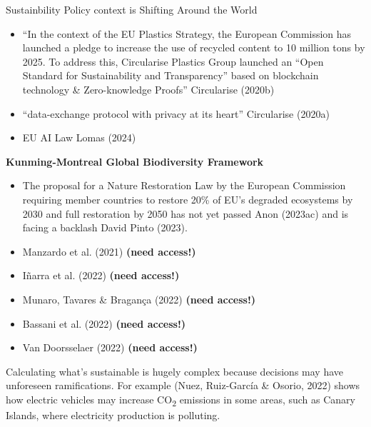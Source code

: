\documentclass[
  letterpaper,
  DIV=11,
  numbers=noendperiod]{scrartcl}
\begin{document}
Sustainbility Policy context is Shifting Around the World

\begin{itemize}
\item
  ``In the context of the EU Plastics Strategy, the European Commission
  has launched a pledge to increase the use of recycled content to 10
  million tons by 2025. To address this, Circularise Plastics Group
  launched an ``Open Standard for Sustainability and Transparency''
  based on blockchain technology \& Zero-knowledge Proofs'' Circularise
  (2020b)
\item
  ``data-exchange protocol with privacy at its heart'' Circularise
  (2020a)
\item
  EU AI Law Lomas (2024)
\end{itemize}

\textbf{Kunming-Montreal Global Biodiversity Framework}

\begin{itemize}
\item
  The proposal for a Nature Restoration Law by the European Commission
  requiring member countries to restore 20\% of EU's degraded ecosystems
  by 2030 and full restoration by 2050 has not yet passed Anon (2023ac)
  and is facing a backlash David Pinto (2023).
\item
  Manzardo et al. (2021) \textbf{(need access!)}
\item
  Iñarra et al. (2022) \textbf{(need access!)}
\item
  Munaro, Tavares \& Bragança (2022) \textbf{(need access!)}
\item
  Bassani et al. (2022) \textbf{(need access!)}
\item
  Van Doorsselaer (2022) \textbf{(need access!)}
\end{itemize}

Calculating what's sustainable is hugely complex because decisions may
have unforeseen ramifications. For example (Nuez, Ruiz-García \& Osorio,
2022) shows how electric vehicles may increase CO\textsubscript{2}
emissions in some areas, such as Canary Islands, where electricity
production is polluting.
\end{document}
